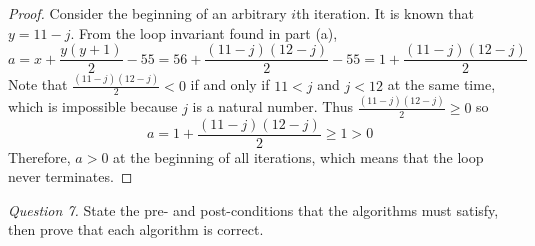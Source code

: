 \documentclass[11pt]{article}
\begin{document}
\begin{enumerate}
\begin{proof}
            Consider the beginning of an arbitrary \(i\)th iteration. It is known that \(y = 11 - j\). From the loop invariant found in part (a),
            \[
                a = x + \frac{y(y+1)}{2} - 55 = 56 + \frac{(11-j)(12-j)}{2} - 55 = 1 + \frac{(11-j)(12-j)}{2}
            \]
            Note that \(\frac{(11-j)(12-j)}{2} < 0\) if and only if \(11 < j\) and \(j < 12\) at the same time, which is impossible because \(j\) is a natural number. Thus \(\frac{(11-j)(12-j)}{2} \geq 0\) so
            \[
                a = 1 + \frac{(11-j)(12-j)}{2} \geq 1 > 0
            \]
            Therefore, \(a >0\) at the beginning of all iterations, which means that the loop never terminates.

        \end{proof}
    \end{enumerate}
    \noindent\textit{Question 7.} State the pre- and post-conditions that the algorithms must satisfy, then prove that each algorithm is correct.
\end{document}
